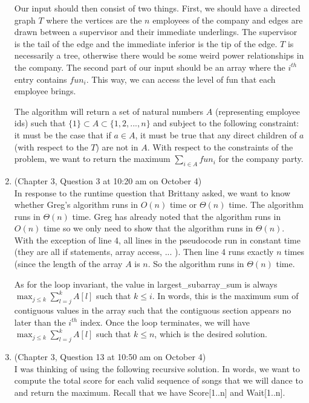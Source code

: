 \documentclass{article}
\begin{document}
\begin{enumerate}
        Our input should then consist of two things. First, we should have a directed graph $T$ where the vertices are the $n$ employees of the company and edges are drawn between a supervisor and their immediate underlings. The supervisor is the tail of the edge and the immediate inferior is the tip of the edge. $T$ is necessarily a tree, otherwise there would be some weird power relationships in the company. The second part of our input should be an array where the $i^{th}$ entry contains $fun_i$. This way, we can access the level of fun that each employee brings.

        The algorithm will return a set of natural numbers $A$ (representing employee ids) such that $ \{ 1 \} \subset A \subset \{ 1, 2, ... , n \} $ and subject to the following constraint: it must be the case that if $ a \in A $, it must be true that any direct children of $a$ (with respect to the $T$) are not in $A$. With respect to the constraints of the problem, we want to return the maximum $\sum_{i \in A} fun_i $ for the company party.
    \item (Chapter 3, Question 3 at 10:20 am on October 4) \\
        In response to the runtime question that Brittany asked, we want to know whether Greg's algorithm runs in $O (n)$ time or $\Theta (n)$ time.
        The algorithm runs in $\Theta (n)$ time.
        Greg has already noted that the algorithm runs in $O (n) $ time so we only need to show that the algorithm runs in $\Theta (n) $.
        With the exception of line 4, all lines in the pseudocode run in constant time (they are all if statements, array access, ... ).
        Then line 4 runs exactly $n$ times (since the length of the array $A$ is $n$.
        So the algorithm runs in $\Theta (n)$ time.

        As for the loop invariant, the value in largest\_subarray\_sum is always $\max _{j \leq k} \sum _{l=j}^k A[l] $ such that $k \leq i$.
        In words, this is the maximum sum of contiguous values in the array such that the contiguous section appears no later than the $i^{th}$ index.
        Once the loop terminates, we will have $\max _{j \leq k} \sum _{l=j}^k A[l] $ such that $k \leq n $, which is the desired solution.
    \item (Chapter 3, Question 13 at 10:50 am on October 4) \\
        I was thinking of using the following recursive solution. In words, we want to compute the total score for each valid sequence of songs that we will dance to and return the maximum. Recall that we have Score[1..n] and Wait[1..n].


\end{enumerate}
\end{document}
